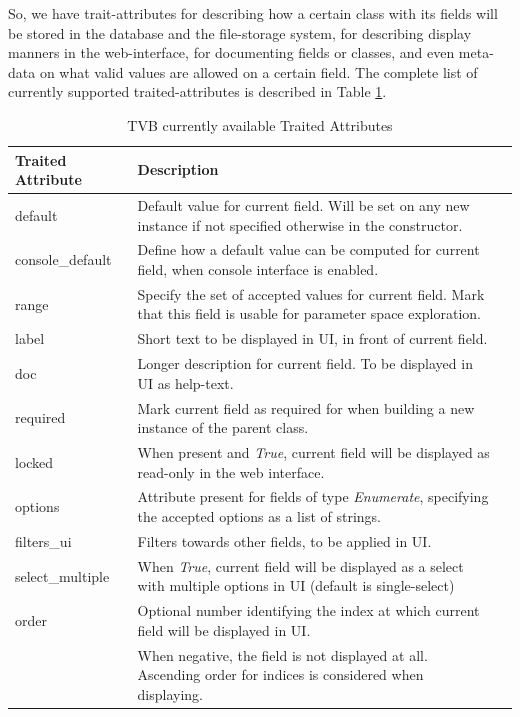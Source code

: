 So, we have trait-attributes for describing how a certain class with its fields 
will be stored in the database and the file-storage system,
for describing display manners in the web-interface, for documenting fields or classes, 
and even meta-data on what valid values are allowed on a certain field. 
The complete list of currently supported traited-attributes is described in Table \ref{tab:traits}.

\begin{center}
	\begin{table}[ht]
  	\label{tab:traits}
  	\caption{TVB currently available Traited Attributes}

	\begin{tabularx}{\textwidth}{lll}
      		\toprule
      		Traited Attribute    & Description  \\ 
      		\midrule
		default 	& Default value for current field. Will be set on any new instance if not specified otherwise in the constructor.  \\
		console\_default & Define how a default value can be computed for current field, when console interface is enabled. \\
		range	& Specify the set of accepted values for current field. Mark that this field is usable for parameter space exploration. \\

		label		& Short text to be displayed in UI, in front of current field. \\
		doc		& Longer description for current field. To be displayed in UI as help-text. \\
		required	& Mark current field as required for when building a new instance of the parent class. \\
		locked	& When present and \emph{True}, current field will be displayed as read-only in the web interface. \\

		options	& Attribute present for fields of type \emph{Enumerate}, specifying the accepted options as a list of strings. \\
		filters\_ui	& Filters towards other fields, to be applied in UI. \\
		select\_multiple & When \emph{True}, current field will be displayed as a select  with multiple options in UI (default is single-select) \\
		order	& Optional number identifying the index at which current field will be displayed in UI. \\
				& When negative, the field is not displayed at all. Ascending order for indices is considered when displaying. \\


\end{tabularx}
\end{table}
\end{center}
